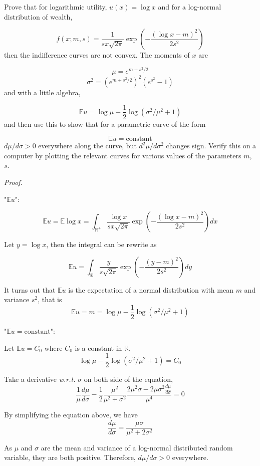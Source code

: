 \documentclass[a4paper]{article}
\begin{document}
Prove that for logarithmic utility, $u(x)=\log x$ and for a log-normal distribution of wealth,

\[f(x;m,s)=\frac{1}{sx\sqrt{2\pi}} \exp{\left(-\frac{(\log x-m)^2}{2s^2}\right)}\]
then the indifference curves are not convex. The moments of $x$ are

\[\mu=e^{m+s^2/2}\]
\[\sigma^2=(e^{m+s^2/2})^2 (e^{s^2}-1)\]
and with a little algebra,

\[\mathbb{E}u=\log \mu-\frac12\log(\sigma^2/\mu^2+1)\]
and then use this to show that for a parametric curve of the form 

\[\mathbb{E}u=\text{constant}\]
$d\mu/d\sigma >0$ everywhere along the curve, but $d^2\mu/d\sigma^2$ changes sign. Verify this on a computer by plotting the relevant curves for various values of the parameters $m$, $s$.\newline

\textit{Proof.}\newline

"$\mathbb{E}u$":\newline

\[\mathbb{E}u=\mathbb{E}\log x=\int_{\mathbb{R}^{+}} \frac{\log x}{sx\sqrt{2\pi}} \exp{\left(-\frac{(\log x-m)^2}{2s^2}\right)} dx\]

Let $y=\log x$, then the integral can be rewrite as

\[\mathbb{E}u=\int_\mathbb{R} \frac{y}{s\sqrt{2\pi}} \exp{\left(-\frac{(y-m)^2}{2s^2}\right)} dy\]

It turns out that $\mathbb{E}u$ is the expectation of a normal distribution with mean $m$ and variance $s^2$, that is
\[\mathbb{E}u=m=\log \mu-\frac12\log(\sigma^2/\mu^2+1)\]

"$\mathbb{E}u=\text{constant}$":\newline

Let $\mathbb{E}u=C_0$ where $C_0$ is a constant in $\mathbb{R}$,
\[\log \mu-\frac12\log(\sigma^2/\mu^2+1)=C_0\]

Take a derivative \textit{w.r.t.} $\sigma$ on both side of the equation,
\[\frac{1}{\mu} \frac{d\mu}{d\sigma}-\frac12 \frac{\mu^2}{\mu^2+\sigma^2} \frac{2\mu^2\sigma-2\mu\sigma^2 \frac{d\mu}{d\sigma}}{\mu^4}=0\]

By simplifying the equation above, we have
\[\frac{d\mu}{d\sigma}=\frac{\mu\sigma}{\mu^2+2\sigma^2}\]

As $\mu$ and $\sigma$ are the mean and variance of a log-normal distributed random variable, they are both positive. Therefore, $d\mu/d\sigma>0$ everywhere.\newline
\end{document}
